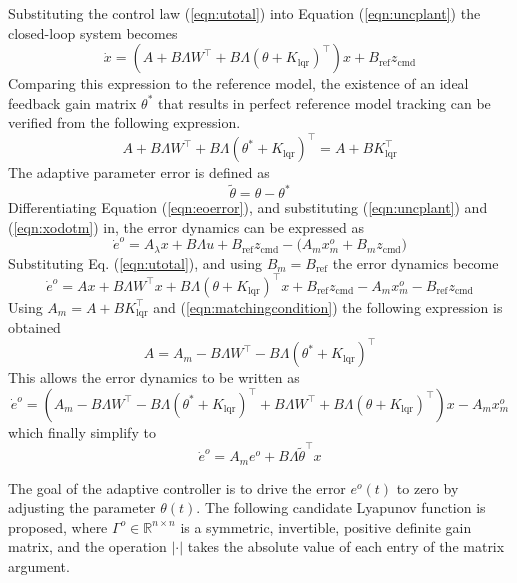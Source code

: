 Substituting the control law (\ref{eqn:utotal}) into Equation (\ref{eqn:uncplant}) the closed-loop system becomes
\begin{equation}
  \dot{x}=\left(A+B\Lambda W^{\top}+B\Lambda(\theta+K_{\text{lqr}})^{\top}\right)x+B_{\text{ref}}z_{\text{cmd}}
\end{equation}
Comparing this expression to the reference model, the existence of an ideal feedback gain matrix $\theta^{*}$ that results in perfect reference model tracking can be verified from the following expression.
\begin{equation}
  \label{eqn:matchingcondition}
  A+B\Lambda W^{\top}+B\Lambda(\theta^{*}+K_{\text{lqr}})^{\top}=A+BK_{\text{lqr}}^{\top}
\end{equation}
The adaptive parameter error is defined as
\begin{equation}
  \tilde{\theta}=\theta-\theta^{*}
\end{equation}
Differentiating Equation (\ref{eqn:eoerror}), and substituting (\ref{eqn:uncplant}) and (\ref{eqn:xodotm}) in, the error dynamics can be expressed as
\begin{equation}
  \dot{e}^{o}=A_{\lambda}x+B\Lambda u+B_{\text{ref}}z_{\text{cmd}}-\bigr(A_{m}x_{m}^{o}+B_{m}z_{\text{cmd}}\bigr)
\end{equation}
Substituting Eq. (\ref{eqn:utotal}), and using $B_{m}=B_{\text{ref}}$ the error dynamics become
\begin{equation}
  \dot{e}^{o}=Ax+B\Lambda W^{\top}x+B\Lambda(\theta+K_{\text{lqr}})^{\top}x+B_{\text{ref}}z_{\text{cmd}}-A_{m}x_{m}^{o}-B_{\text{ref}}z_{\text{cmd}}
\end{equation}
Using $A_{m}=A+BK_{\text{lqr}}^{\top}$ and (\ref{eqn:matchingcondition}) the following expression is obtained
\begin{equation}
  A=A_{m}-B\Lambda W^{\top}-B\Lambda(\theta^{*}+K_{\text{lqr}})^{\top}
\end{equation}
This allows the error dynamics to be written as
\begin{equation}
  \dot{e}^{o}=\left(A_{m}-B\Lambda W^{\top}-B\Lambda(\theta^{*}+K_{\text{lqr}})^{\top}+B\Lambda W^{\top}+B\Lambda(\theta+K_{\text{lqr}})^{\top}\right)x-A_{m}x_{m}^{o}
\end{equation}
which finally simplify to
\begin{equation}
  \label{eqn:eodotfin}
  \dot{e}^{o}=A_{m}e^{o}+B\Lambda{\tilde{\theta}}^{\top}x
\end{equation}

The goal of the adaptive controller is to drive the error $e^{o}(t)$ to zero by adjusting the parameter $\theta(t)$.
The following candidate Lyapunov function is proposed, where $\Gamma^{o}\in\mathbb{R}^{n\times n}$ is a symmetric, invertible, positive definite gain matrix, and the operation $|\cdot|$ takes the absolute value of each entry of the matrix argument.


